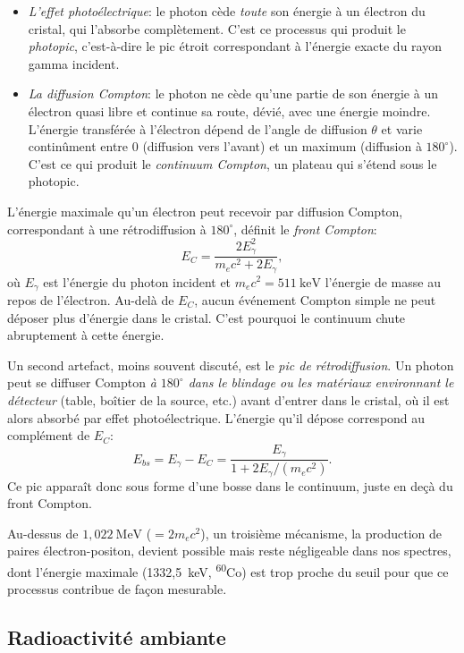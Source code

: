 \documentclass[11pt,letterpaper]{article}
\newcommand{\beq}[1]{\begin{equation} \label{#1}}
\def\enq{\end{equation}}
\begin{document}
\begin{itemize}
    \item \emph{L'effet photoélectrique}: le photon cède \emph{toute} son énergie à un électron du cristal, qui l'absorbe complètement. C'est ce processus qui produit le \emph{photopic}, c'est-à-dire le pic étroit correspondant à l'énergie exacte du rayon gamma incident.
    \item \emph{La diffusion Compton}: le photon ne cède qu'une partie de son énergie à un électron quasi libre et continue sa route, dévié, avec une énergie moindre. L'énergie transférée à l'électron dépend de l'angle de diffusion $\theta$ et varie continûment entre 0 (diffusion vers l'avant) et un maximum (diffusion à $180^\circ$). C'est ce qui produit le \emph{continuum Compton}, un plateau qui s'étend sous le photopic.
\end{itemize}

L'énergie maximale qu'un électron peut recevoir par diffusion Compton, correspondant à une rétrodiffusion à $180^\circ$, définit le \emph{front Compton}:
\beq{eq:compton_edge}
    E_C = \frac{2E_\gamma^2}{m_e c^2 + 2E_\gamma} ,
\enq
où $E_\gamma$ est l'énergie du photon incident et $m_e c^2 = 511~\text{keV}$ l'énergie de masse au repos de l'électron. Au-delà de $E_C$, aucun événement Compton simple ne peut déposer plus d'énergie dans le cristal. C'est pourquoi le continuum chute abruptement à cette énergie.

Un second artefact, moins souvent discuté, est le \emph{pic de rétrodiffusion}. Un photon peut se diffuser Compton \emph{à $180^\circ$ dans le blindage ou les matériaux environnant le détecteur} (table, boîtier de la source, etc.) avant d'entrer dans le cristal, où il est alors absorbé par effet photoélectrique. L'énergie qu'il dépose correspond au complément de $E_C$:
\beq{eq:backscatter}
    E_{bs} = E_\gamma - E_C = \frac{E_\gamma}{1 + 2E_\gamma / (m_e c^2)} .
\enq
Ce pic apparaît donc sous forme d'une bosse dans le continuum, juste en deçà du front Compton.

Au-dessus de $1{,}022~\text{MeV}$ ($= 2 m_e c^2$), un troisième mécanisme, la production de paires électron-positon, devient possible mais reste négligeable dans nos spectres, dont l'énergie maximale (1332,5~keV, \textsuperscript{60}Co) est trop proche du seuil pour que ce processus contribue de façon mesurable.

\subsection{Radioactivité ambiante}
\end{document}
